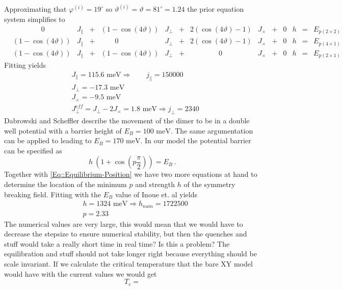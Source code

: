	Approximating that $\varphi^{(i)} =	19^\circ$ so $\vartheta^{(i)} = \vartheta =	81^\circ =	1.24 $ the prior equation system simplifies to
	\begin{align}
		&\qquad \qquad 0&J_\parallel&+&\left(1-\cos(4\vartheta)\right)&J_\perp&+&2\left(\cos(4\vartheta) - 1\right)&J_\times&+&0&h&=& E_{p(2\times2)} \\
		&\left(1-\cos(4\vartheta) \right)&J_\parallel&+&\qquad 0&J_\perp&+&2\left(\cos(4\vartheta)-1 \right)&J_\times&+&0 &h&=& E_{p(4\times1)} \\ 		
		&\left(1-\cos(4\vartheta) \right)&J_\parallel&
		+&\left(1 - \cos\left(4\vartheta \right)\right)&J_\perp&
		+&\qquad \qquad 0&J_\times&
		+&0&h& 
		=&E_{p(2\times1)}
	\end{align}
	Fitting yields
	\begin{align}
		&J_\parallel =	115.6 \text{ meV} \Rightarrow \qquad j_\parallel =	150000 \\
		&J_\perp =	-17.3 \text{ meV} \\
		&J_\times =	-9.5 \text{ meV} \\
		&J_\perp^{eff}=	J_\perp - 2 J_\times =	1.8 \text{ meV} \Rightarrow j_\perp = 2340  
	\end{align}
	Dabrowski and Scheffler \cite{dabrowski1992self} describe the movement of the dimer to be in a double well potential with a barrier height of $E_B =	100 \text{ meV}$. The same argumentation can be applied to \cite{inoue1994order} leading to $E_B =	170 \text{ meV}$. In our model the potential barrier can be specified as
	\begin{equation}
		h~(1 + \cos \left(p \frac{\pi}{2}\right)) =	E_B ~.
	\end{equation}
	Together with \autoref{Eq::Equilibrium-Position} we have two more equations at hand to determine the location of the minimum $p$ and strength $h$ of the symmetry breaking field. Fitting with the $E_B$ value of Inoue et. al yields
	\begin{align}
		&h =	1324 \text{ meV} \Rightarrow h_{num} =	 1722500 \\
		&p =	2.33
	\end{align}
	The numerical values are very large, this would mean that we would have to decrease the stepsize to ensure numerical stability, but then the quenches and stuff would take a really short time in real time? Is this a problem? The equilibration and stuff should not take longer right because everything should be scale invariant. If we calculate the critical temperature that the bare XY model would have with the current values we would get
	\begin{equation}
		T_c =	
	\end{equation}
